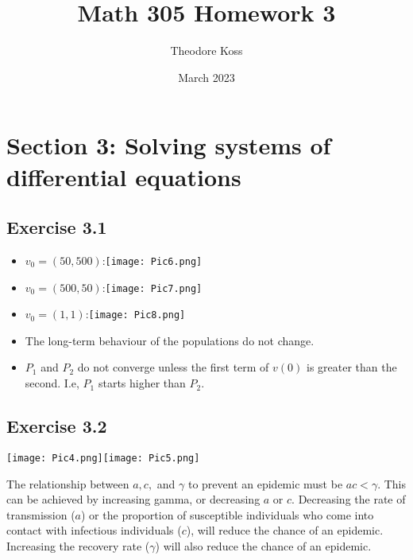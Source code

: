 \documentclass{article}
\title{Math 305 Homework 3}
\author{Theodore Koss}
\date{March 2023}
\newcommand{\myskip}{\par\null\par}
\begin{document}
\maketitle

\section*{Section 3: Solving systems of differential equations}
\subsection*{Exercise 3.1}
\begin{itemize}
    \item $v_0=(50,500)$:\newline \texttt{[image: Pic6.png]}
    \item $v_0=(500,50)$:\newline \texttt{[image: Pic7.png]}
    \item $v_0=(1,1)$:\newline \texttt{[image: Pic8.png]}
\end{itemize}
\begin{itemize}
    \item The long-term behaviour of the populations do not change.
    \item $P_1$ and $P_2$ do not converge unless the first term of $v(0)$ is greater than the second. I.e, $P_1$ starts higher than $P_2$.
\end{itemize}
\subsection*{Exercise 3.2}
\texttt{[image: Pic4.png]}\newline\texttt{[image: Pic5.png]}\myskip The relationship between $a,c,$ and $\gamma$ to prevent an epidemic must be $ac<\gamma$. This can be achieved by increasing gamma, or decreasing $a$ or $c$. Decreasing the rate of transmission ($a$) or the proportion of susceptible individuals who come into contact with infectious individuals ($c$), will reduce the chance of an epidemic. Increasing the recovery rate ($\gamma$) will also reduce the chance of an epidemic.
\end{document}
